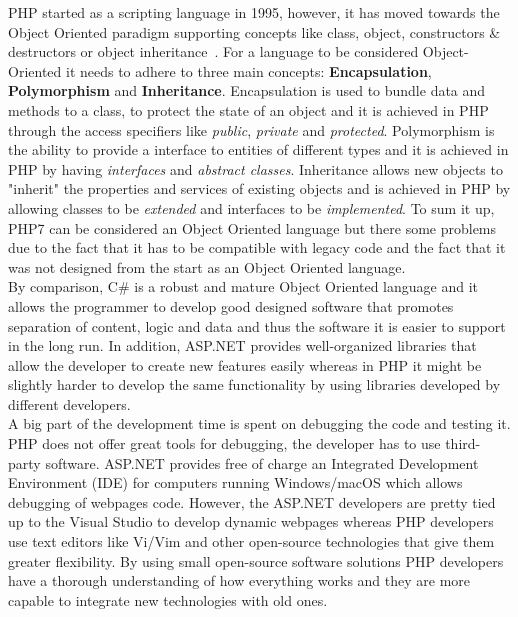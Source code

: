 \documentclass[11]{article}
\begin{document}
	\indent
	PHP started as a scripting language in 1995, however, it has moved towards the Object Oriented paradigm supporting concepts like class, object, constructors \& destructors or object inheritance~\citep{PhpOop}. For a language to be considered Object-Oriented it needs to adhere to three main concepts: \textbf{Encapsulation}, \textbf{Polymorphism} and \textbf{Inheritance}. Encapsulation is used to bundle data and methods to a class, to protect the state of an object and it is achieved in PHP through the access specifiers like \textit{public}, \textit{private} and \textit{protected}. Polymorphism is the ability to provide a interface to entities of different types and it is achieved in PHP by having \textit{interfaces} and \textit{abstract classes}. Inheritance allows new objects to "inherit" the properties and services of existing objects and is achieved in PHP by allowing classes to be \textit{extended} and interfaces to be \textit{implemented}. To sum it up, PHP7 can be considered an Object Oriented language but there some problems due to the fact that it has to be compatible with legacy code and the fact that it was not designed from the start as an Object Oriented language.\\
	By comparison, C\# is a robust and mature Object Oriented language and it allows the programmer to develop good designed software that promotes separation of content, logic and data and thus the software it is easier to support in the long run. In addition, ASP.NET provides well-organized libraries that allow the developer to create new features easily  whereas in PHP it might be slightly harder to develop the same functionality by using libraries developed by different developers. \\

	\indent
	A big part of the development time is spent on debugging the code and  testing it. PHP does not offer great tools for debugging, the developer has to use third-party software. ASP.NET provides free of charge an Integrated Development Environment (IDE) for computers running Windows/macOS which allows debugging of webpages code. However, the ASP.NET developers are pretty tied up to the Visual Studio to develop dynamic webpages whereas PHP developers use text editors like Vi/Vim and other open-source technologies that give them greater flexibility. By using small open-source software solutions PHP developers have a thorough understanding of how everything works and they are more capable to integrate new technologies with old ones.\\
	
\end{document}
